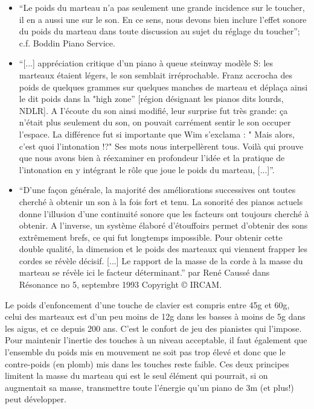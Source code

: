 \documentclass[french,a4paper,12pt]{report}
\begin{document}
\begin{itemize}
	\item  “Le poids du marteau n'a pas seulement une grande incidence sur le toucher, il en a aussi une sur le son. En ce sens, nous devons bien inclure l'effet sonore du poids du marteau dans toute discussion au sujet du réglage du toucher”; c.f. Boddin Piano Service.

	\item  “[...] appréciation critique d'un piano à queue steinway modèle S: les marteaux étaient légers, le son semblait irréprochable. Franz accrocha des poids de quelques grammes sur quelques manches de marteau et déplaça ainsi le dit poids dans la "high zone” [région désignant les pianos dits lourds, NDLR]. A I'écoute du son ainsi modifié, leur surprise fut
très grande: ça n'était plus seulement du son, on pouvait carrément sentir le son occuper l'espace. La différence fut si importante que Wim s'exclama : " Mais alors, c'est quoi l'intonation !?" Ses mots nous interpellèrent tous. Voilà qui prouve que nous avons bien à réexaminer en profondeur l'idée et la pratique de l'intonation en y intégrant le rôle que
joue le poids du marteau, [...]”.

	\item  “D'une façon générale, la majorité des améliorations successives ont toutes cherché à obtenir un son à la fois fort et tenu. La sonorité des pianos actuels donne l'illusion d'une continuité sonore que les facteurs ont toujours cherché à obtenir. A l'inverse, un système élaboré d'étouffoirs permet d'obtenir des sons extrêmement brefs, ce qui fut longtemps impossible. Pour obtenir cette double qualité, la dimension et le poids des marteaux qui viennent frapper les cordes se révèle décisif. [...] Le rapport de la masse de la corde à la masse du marteau se révèle ici le facteur déterminant.” par René Caussé dans Résonance no 5, septembre 1993 Copyright © IRCAM.

\end{itemize}

Le poids d’enfoncement d’une touche de clavier est compris entre 45g et 60g, celui des marteaux est d’un peu moins de 12g dans les basses à moins de 5g dans les aigus, et ce depuis 200 ans. C’est le confort de jeu des pianistes qui l’impose. Pour maintenir l’inertie des touches à un niveau acceptable, il faut également que l’ensemble du poids mis en mouvement ne soit pas trop élevé et donc que le contre-poids (en plomb) mis dans les touches reste faible. Ces deux principes limitent la masse du marteau qui est le seul élément qui pourrait, si on augmentait sa masse, transmettre toute l’énergie qu’un piano de 3m (et plus!) peut développer.
\end{document}

